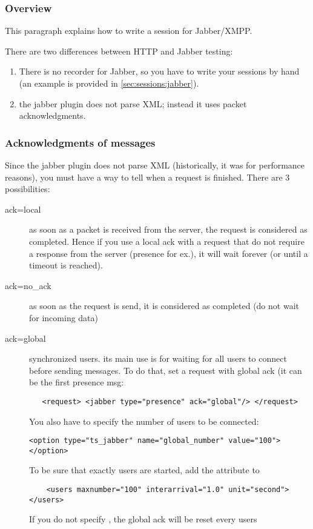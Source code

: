 \documentclass{TSUNG-en}
\begin{document}
\subsubsection{Overview}

This paragraph explains how to write a session for Jabber/XMPP.

There are two differences between HTTP and Jabber testing:
\begin{enumerate}
\item There is no recorder for Jabber, so you have to write your
  sessions by hand (an example is provided in
  \ref{sec:sessions:jabber}).
\item the jabber plugin does not parse XML; instead it uses packet
  acknowledgments.
\end{enumerate}


\subsubsection{Acknowledgments of messages}

Since the jabber plugin does not parse XML (historically, it was for
performance reasons), you must have a way to tell when a request is
finished. There are 3 possibilities:

\begin{description}
 \item[ack=local] as soon as a packet is received from the server, the
request is considered as completed. Hence if you use a local ack with a request
that do not require a response from the server (presence for ex.), it
 will wait forever (or until a timeout is reached).
 \item[ack=no\_ack] as soon as the request is send, it is considered as completed (do
not wait for incoming data)
 \item[ack=global] synchronized users. its main use is for waiting for all
users to connect before sending messages. To do that, set a request
with global ack (it can be the first presence msg:

\begin{Verbatim}
   <request> <jabber type="presence" ack="global"/> </request>
\end{Verbatim}


You also have to specify the number of users to be connected:

\begin{Verbatim}
<option type="ts_jabber" name="global_number" value="100"></option>
\end{Verbatim}

To be sure that exactly  users are started, add the
 attribute to 

\begin{Verbatim}
    <users maxnumber="100" interarrival="1.0" unit="second"></users>
\end{Verbatim}

If you do not specify , the global ack will be reset every
 users
\end{description}
\end{document}
